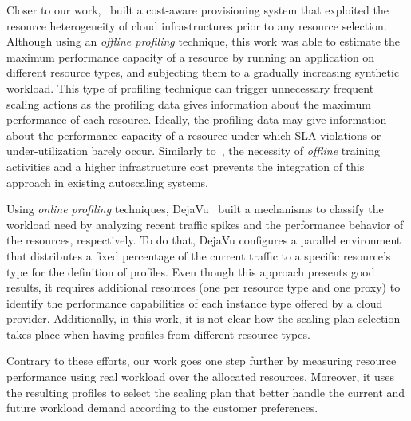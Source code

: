 Closer to our work,~\cite{sharma_cost-aware_2011} built a cost-aware provisioning system that exploited the resource heterogeneity of cloud infrastructures prior to any resource selection. Although using an \emph{offline profiling} technique, this work was able to estimate the maximum performance capacity of a resource by running an application on different resource types, and subjecting them to a gradually increasing synthetic workload. This type of profiling technique can trigger unnecessary frequent scaling actions as the profiling data gives information about the maximum performance of each resource. Ideally, the profiling data may give information about the performance capacity of a resource under which SLA violations or under-utilization barely occur. Similarly to~\cite{smartscale_2012}, the necessity of \emph{offline} training activities and a higher infrastructure cost prevents the integration of this approach in existing autoscaling systems.  

Using \emph{online profiling} techniques, DejaVu~\cite{dejavu2012}  built a mechanisms to classify the workload need by analyzing recent traffic spikes and the performance behavior of the resources, respectively. To do that, DejaVu configures a parallel environment that distributes a fixed percentage of the current traffic to a specific resource's type for the definition of profiles. Even though this approach presents good results, it requires additional resources (one per resource type and one proxy) to identify the performance capabilities of each instance type offered by a cloud provider. Additionally, in this work, it is not clear how the scaling plan selection takes place when having profiles from different resource types. %


Contrary to these efforts, our work goes one step further by measuring resource performance using real workload over the allocated resources. Moreover, it uses the resulting profiles to select the scaling plan that better handle the current and future workload demand according to the customer preferences.

